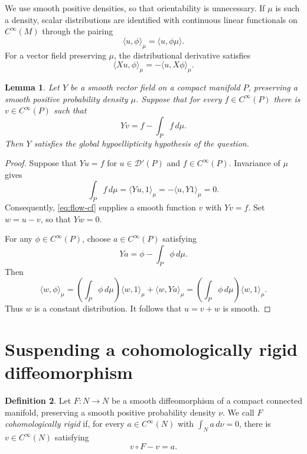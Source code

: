 \documentclass[11pt]{article}
\newtheorem{lemma}{Lemma}
\theoremstyle{definition}
\newtheorem{definition}[lemma]{Definition}
\theoremstyle{remark}
\newcommand{\Dprime}{\mathcal{D}'}
\begin{document}
We use smooth positive densities, so that orientability is unnecessary.
If $\mu$ is such a density, scalar distributions are identified with
continuous linear functionals on $C^\infty(M)$ through the pairing
\[
 \langle u,\phi\rangle_\mu
 =
 \langle u,\phi\mu\rangle.
\]
For a vector field preserving $\mu$, the distributional derivative
satisfies
\[
 \langle Xu,\phi\rangle_\mu
 =
 -\langle u,X\phi\rangle_\mu.
\]

\begin{lemma}\label{lem:cf-gh}
Let $Y$ be a smooth vector field on a compact manifold $P$, preserving
a smooth positive probability density $\mu$. Suppose that for every
$f\in C^\infty(P)$ there is $v\in C^\infty(P)$ such that
\begin{equation}\label{eq:flow-cf}
 Yv=f-\int_P f\,d\mu.
\end{equation}
Then $Y$ satisfies the global hypoellipticity hypothesis of the question.
\end{lemma}

\begin{proof}
Suppose that $Yu=f$ for $u\in\Dprime(P)$ and $f\in C^\infty(P)$.
Invariance of $\mu$ gives
\[
 \int_P f\,d\mu
 =
 \langle Yu,1\rangle_\mu
 =
 -\langle u,Y1\rangle_\mu
 =
 0.
\]
Consequently, \eqref{eq:flow-cf} supplies a smooth function $v$ with
$Yv=f$. Set $w=u-v$, so that $Yw=0$.

For any $\phi\in C^\infty(P)$, choose $a\in C^\infty(P)$ satisfying
\[
 Ya=\phi-\int_P\phi\,d\mu.
\]
Then
\[
 \langle w,\phi\rangle_\mu
 =
 \left(\int_P\phi\,d\mu\right)\langle w,1\rangle_\mu
 +\langle w,Ya\rangle_\mu
 =
 \left(\int_P\phi\,d\mu\right)\langle w,1\rangle_\mu.
\]
Thus $w$ is a constant distribution. It follows that $u=v+w$ is smooth.
\end{proof}

\section{Suspending a cohomologically rigid diffeomorphism}

\begin{definition}
Let $F:N\to N$ be a smooth diffeomorphism of a compact connected
manifold, preserving a smooth positive probability density $\nu$.
We call $F$ \emph{cohomologically rigid} if, for every
$a\in C^\infty(N)$ with $\int_N a\,d\nu=0$, there is
$v\in C^\infty(N)$ satisfying
\begin{equation}\label{eq:map-cf}
 v\circ F-v=a.
\end{equation}
\end{definition}
\end{document}
